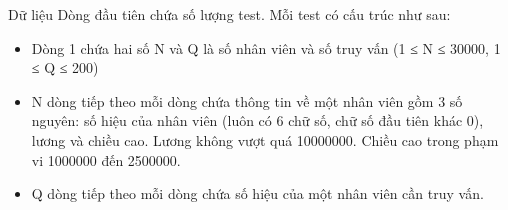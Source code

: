 Dữ liệu
Dòng đầu tiên chứa số lượng test. Mỗi test có cấu trúc như sau:  
\begin{itemize}
	\item     Dòng 1 chứa hai số N và Q là số nhân viên và số truy vấn (1 ≤ N ≤ 30000, 1 ≤ Q ≤ 200)   
	\item     N dòng tiếp theo mỗi dòng chứa thông tin về một nhân viên gồm 3 số nguyên: số hiệu của nhân viên (luôn có 6 chữ số, chữ số đầu tiên khác 0), lương và chiều cao. Lương không vượt quá 10000000. Chiều cao trong phạm vi 1000000 đến 2500000.   
	\item     Q dòng tiếp theo mỗi dòng chứa số hiệu của một nhân viên cần truy vấn.   
\end{itemize}